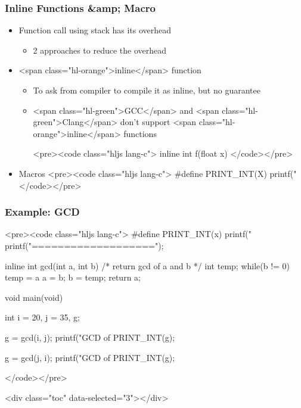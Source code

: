 \documentclass{../c-lecture}
\begin{document}
\begin{frame}
  \frametitle{Inline Functions &amp; Macro}
  \begin{itemize}
    \item Function call using stack has its overhead
    \begin{itemize}
      \item 2 approaches to reduce the overhead
    \end{itemize}
    \item <span class="hl-orange">inline</span> function
    \begin{itemize}
      \item To ask from compiler to compile it as inline, but no guarantee
      \item
        <span class="hl-green">GCC</span> and
        <span class="hl-green">Clang</span> don't support
        <span class="hl-orange">inline</span> functions

      <pre><code class="hljs lang-c">
inline int f(float x)
      </code></pre>
    \end{itemize}
    \item Macros
    <pre><code class="hljs lang-c">
#define PRINT_INT(X) printf("%
    </code></pre>
  \end{itemize}
\end{frame}
\begin{frame}
  \frametitle{Example: GCD}
  <pre><code class="hljs lang-c">
#define PRINT_INT(x) printf("%
                      printf("===================\n");

inline int gcd(int a, int b){ /* return gcd of a and b */
  int temp;
  while(b != 0){
    temp = a %
    a = b;
    b = temp;
  }
  return a;
}

void main(void){
  int i = 20, j = 35, g;

  g = gcd(i, j);
  printf("GCD of %
  PRINT_INT(g);

  g = gcd(j, i);
  printf("GCD of %
  PRINT_INT(g);
}
  </code></pre>
\end{frame}
\begin{frame}
  <div class="toc" data-selected="3"></div>
\end{frame}
\end{document}
